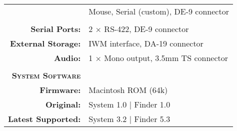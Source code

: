 \begin{tabular}{ r p{6in} }
~ & Mouse, Serial (custom), DE-9 connector \\
\\
\textbf{Serial Ports:} & 2 \(\times\) RS-422, DE-9 connector \\
\textbf{External Storage:} & IWM interface, DA-19 connector \\
\textbf{Audio:} & 1 \(\times\) Mono output, 3.5mm TS connector \\
\\
\textbf{\textsc{System Software}} & ~ \\
\textbf{Firmware:} & Macintosh ROM (64k) \\
\textbf{Original:} & System 1.0 | Finder 1.0 \\
\textbf{Latest Supported:} & System 3.2 | Finder 5.3 \\
\end{tabular}